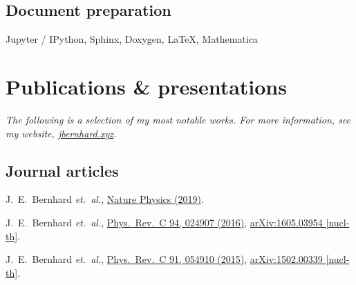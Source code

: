 \documentclass[letterpaper,10pt]{article}
\begin{document}
\begin{multicols}{2}
\subsection{Document preparation}

Jupyter / IPython, Sphinx, Doxygen, \LaTeX, Mathematica



\section{Publications \& presentations}

\vspace{-.5\parskip}
\emph{%
  \small
  The following is a selection of my most notable works.
  For more information, see my website, \href{https://jbernhard.xyz}{jbernhard.xyz}.
}
\vspace{-.5\parskip}



\subsection{Journal articles}

J.~E.~Bernhard \textit{et.\ al.},
\href{https://www.nature.com/articles/s41567-019-0611-8}{Nature Physics (2019)}.

J.~E.~Bernhard \textit{et.\ al.},
\href{https://journals.aps.org/prc/abstract/10.1103/PhysRevC.94.024907}{Phys.\ Rev.\ C 94, 024907 (2016)},
\href{https://arxiv.org/abs/1605.03954}{arXiv:1605.03954 [nucl-th]}.

J.~E.~Bernhard \textit{et.\ al.},
\href{https://journals.aps.org/prc/abstract/10.1103/PhysRevC.91.054910}{Phys.\ Rev.\ C 91, 054910 (2015)},
\href{https://arxiv.org/abs/1502.00339}{arXiv:1502.00339 [nucl-th]}.


\end{multicols}
\end{document}
